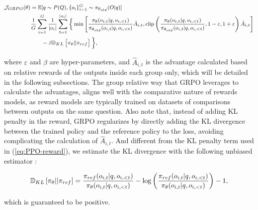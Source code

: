 \begin{itemize}[topsep=0pt]
\begin{equation}
\footnotesize
\begin{split}
    \mathcal{J}_{GRPO}(\theta) &= \mathbb{E}{[q \sim P(Q), \{o_i\}_{i=1}^G \sim \pi_{\theta_{old}}(O|q)]}  \\
    & \frac{1}{G}\sum_{i=1}^G\frac{1}{|o_i|} \sum_{t=1}^{|o_i|} \bigg\{ \min \left[ \frac{\pi_\theta(o_{i,t} | q, o_{i,<t})}{\pi_{\theta_{old}}(o_{i,t} | q, o_{i,<t})} \hat{A}_{i,t}, \text{clip} \left( \frac{\pi_\theta(o_{i,t} | q, o_{i,<t})}{\pi_{\theta_{old}}(o_{i,t} | q, o_{i,<t})}, 1 - \varepsilon, 1 + \varepsilon \right)  \hat{A}_{i,t} \right] \\
    & \qquad - \beta \mathbb{D}_{KL}\left[\pi_{\theta} || \pi_{ref}\right] \bigg\} ,
\end{split}
\label{eq:GRPO-obj}
\end{equation}

where $\varepsilon$ and $\beta$ are hyper-parameters, and $\hat{A}_{i,t}$  is the advantage calculated based on relative rewards of the outputs inside each group only, which will be detailed in the following subsections. The group relative way that GRPO leverages to calculate the advantages, aligns well with the comparative nature of rewards models,  as reward models are typically trained on datasets of comparisons between outputs on the same question. Also note that, instead of adding KL penalty in the reward, GRPO regularizes by directly adding the KL divergence between the trained policy and the reference policy to the loss, avoiding complicating the calculation of  $\hat{A}_{i,t}$. And different from the KL penalty term used in (\ref{eq:PPO-reward}), we estimate the KL divergence with the following unbiased estimator \citep{kl_approx}:

\begin{equation}
\small
    \mathbb{D}_{KL}\left[\pi_{\theta} || \pi_{ref}\right] = \frac{\pi_{ref}(o_{i,t}|q,o_{i,<t})}{\pi_{\theta}(o_{i,t}|q,o_{i,<t})} - \log\left(\frac{\pi_{ref}(o_{i,t}|q,o_{i,<t})}{\pi_{\theta}(o_{i,t}|q,o_{i,<t})}\right) - 1,
\end{equation}

which is guaranteed to be positive.


\end{itemize}

